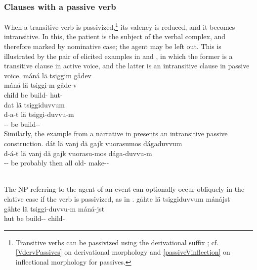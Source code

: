 \subsubsection{Clauses with a passive verb}\label{passiveVoice}
When a transitive verb is passivized,\footnote{Transitive verbs can be passivized using the derivational suffix ; cf. \SEC\ref{VdervPassives} on derivational morphology and \SEC\ref{passiveVinflection} on inflectional morphology for passives.} 
its valency is reduced, and it becomes intransitive. In this, the patient is the subject of the verbal complex, and therefore marked by nominative case; the agent may be left out. This is illustrated by the pair of elicited examples in  and , in which the former is a transitive clause in active voice, and the latter is an intransitive clause in passive voice. %
\ea\label{passVoiceEx1}%
\glll	máná lä tsiggim gådev\\
	máná lä tsiggi-m gåde-v\\
	child\BS{} be\BS{} build- hut-\\\nopagebreak
{}	
\z
\ea\label{passVoiceEx2}%
\glll	dat lä tsiggiduvvum\\
	d-a-t lä tsiggi-duvvu-m\\
	-- be\BS{} build--\\\nopagebreak
{}	
\z
Similarly, the example from a narrative in  presents an intransitive passive construction.
\ea\label{passVoiceEx2b}%
\glll	dát lä vanj dä gajk vuorasumos dágaduvvum\\
	d-á-t lä vanj dä gajk vuorasu-mos dága-duvvu-m\\
	-- be\BS{} probably then all old-\BS{} make--\\\nopagebreak
{}\\	
\z

The NP referring to the agent of an event can optionally occur obliquely in the elative case if the verb is passivized, as in . \ea\label{passVoiceEx3}%
\glll	gåhte lä tsiggiduvvum mánájst\\
	gåhte lä tsiggi-duvvu-m máná-jst\\
	hut\BS{} be\BS{} build-- child-\\\nopagebreak
{}	
\z



